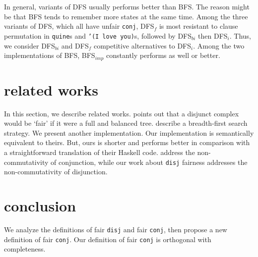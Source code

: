 \documentclass[format=acmlarge, review=false, authordraft=false]{acmart}
\newcommand{\conj}{\texttt{conj}}
\newcommand{\disj}{\texttt{disj}}
\newcommand{\appendo}{\texttt{append$^o$}}
\newcommand{\reverso}{\texttt{revers$^o$}}
\newcommand{\DFSi }[0]{DFS$_{i}$}
\newcommand{\DFSf }[0]{DFS$_{f}$}
\newcommand{\DFSbi}[0]{DFS$_{bi}$}
\newcommand{\BFS}[0]{BFS}
\newcommand{\BFSimp}[0]{BFS$_{imp}$}
\begin{document}

In general, variants of DFS usually performs better than BFS. The reason might 
be that \BFS{} tends to remember more states at the same time. Among the three 
variants of DFS, which all have unfair \conj{}, \DFSf{} is most resistant to 
clause permutation in \texttt{quine}s and \texttt{'(I love you)}s, followed by 
\DFSbi{} then \DFSi{}. Thus, we consider \DFSbi{} and \DFSf{} competitive 
alternatives to \DFSi{}. Among the two implementations of \BFS, \BFSimp{} 
constantly performs as well or better.

\section{related works}

In this section, we describe related works. 
\citet{yang2010adventures} points 
out that a disjunct complex would be `fair' if it were a full and balanced tree.
\citet{seres1999algebra} describe a breadth-first search 
strategy. We present another implementation. Our implementation is semantically 
equivalent to theirs. But, ours is shorter and performs better in comparison 
with a straightforward translation of their Haskell code.
\citet{rozplokhas2018improving} address the non-commutativity of conjunction, 
while our work about \disj{} fairness addresses the non-commutativity of 
disjunction.

\section{conclusion}

We analyze the definitions of fair \disj{} and fair \conj{}, then propose a 
new definition of fair \conj{}. Our definition of fair \conj{} is orthogonal 
with completeness.
\end{document}
